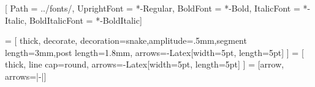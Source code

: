 \usepackage{tikz}
\usepackage{fontawesome5}
\usepackage{fontspec}
\usepackage{color}
\usepackage{csquotes}
\usepackage{xspace}
\RequirePackage[scaled=.9]{FiraMono}
\usetikzlibrary{
    calc,
    arrows.meta,
    decorations.pathmorphing,
    positioning,
    shapes.geometric
}


\setmainfont{TeXGyreTermes}[
    Path = ../fonts/,
    UprightFont = *-Regular,
    BoldFont = *-Bold,
    ItalicFont = *-Italic,
    BoldItalicFont = *-BoldItalic]

 = [
  thick, decorate,
  decoration={snake,amplitude=.5mm,segment length=3mm,post length=1.8mm},
  arrows={-Latex[width=5pt, length=5pt]}
]
  = [
  thick, line cap=round,
  arrows={-Latex[width=5pt, length=5pt]}
]
  = [arrow, arrows={|-|}]
